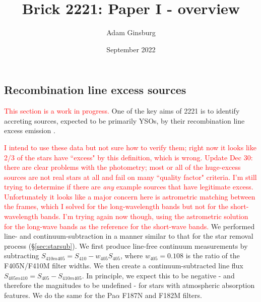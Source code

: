 \documentclass[times,astrosymb]{aastex631}
\def\todo#1{\textcolor{red}{#1}}
\begin{document}
\title{Brick 2221: Paper I - overview}
\author[0000-0001-6431-9633]{Adam Ginsburg}
\date{September 2022}
\subsection{Recombination line excess sources}
\label{sec:recomb}
\todo{This section is a work in progress.}
One of the key aims of 2221 is to identify accreting sources, expected to be primarily YSOs, by their recombination line excess emission \citep[e.g.,][]{Hartmann2016,Alcala2017}.

\todo{I intend to use these data but not sure how to verify them; right now it looks like 2/3 of the stars have ``excess" by this definition, which is wrong.
Update Dec 30: there are clear problems with the photometry; most or all of the huge-excess sources are not real stars at all and fail on many ``quality factor" criteria.
I'm still trying to determine if there are \emph{any} example sources that have legitimate excess.
Unfortunately it looks like a major concern here is astrometric matching between the frames, which I solved for the long-wavelength bands but not for the short-wavelength bands.
I'm trying again now though, using the astrometric solution for the long-wave bands as the reference for the short-wave bands.
}
We performed line- and continuum-subtraction in a manner similar to that for the star removal process (\S \ref{sec:starsub}).
We first produce line-free continuum measurements by subtracting $S_{410m405} = S_{410} - w_{405} S_{405}$, where $w_{405}=0.108$ is the ratio of the F405N/F410M filter widths.
We then create a continuum-subtracted line flux $S_{405m410} = S_{405}-S_{410m405}$.
In principle, we expect this to be negative - and therefore the magnitudes to be undefined - for stars with atmospheric absorption features.
We do the same for the Pa$\alpha$ F187N and F182M filters.
\end{document}
